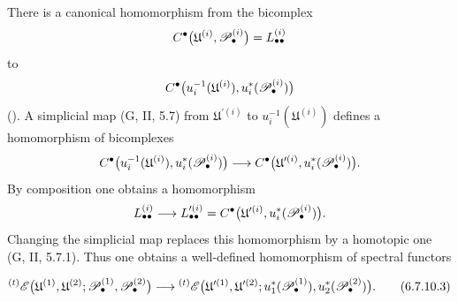 \begin{env}[6.7.10]
There is a canonical homomorphism from the bicomplex
\[
  C^\bullet
  \bigl(
    \mathfrak U^{(i)},\mathscr{P}_\bullet^{(i)}
  \bigr)
  =
  L_{\bullet\bullet}^{(i)}
\]
to
\[
  C^\bullet
  \bigl(
    u_i^{-1}(\mathfrak U^{(i)}),
    u_i^*(\mathscr{P}_\bullet^{(i)})
  \bigr)
\]
().  A simplicial map
\textnormal{(G, II, 5.7)} from $\mathfrak U^{\prime(i)}$ to
$u_i^{-1}(\mathfrak U^{(i)})$ defines a homomorphism of
bicomplexes
\[
  C^\bullet
  \bigl(
    u_i^{-1}(\mathfrak U^{(i)}),
    u_i^*(\mathscr{P}_\bullet^{(i)})
  \bigr)
  \longrightarrow
  C^\bullet
  \bigl(
    \mathfrak U^{\prime(i)},
    u_i^*(\mathscr{P}_\bullet^{(i)})
  \bigr).
\]
By composition one obtains a homomorphism
\[
  L_{\bullet\bullet}^{(i)}
  \longrightarrow
  L_{\bullet\bullet}^{\prime(i)}
  =
  C^\bullet
  \bigl(
    \mathfrak U^{\prime(i)},
    u_i^*(\mathscr{P}_\bullet^{(i)})
  \bigr).
\]
Changing the simplicial map replaces this homomorphism by a
homotopic one \textnormal{(G, II, 5.7.1)}.  Thus one obtains a
well-defined homomorphism of spectral functors
\begin{env}[6.7.10.3]
\label{III.6.7.10.3}
\[
  {}^{(t)}\mathscr{E}
  \bigl(
    \mathfrak U^{(1)},\mathfrak U^{(2)};
    \mathscr{P}_\bullet^{(1)},\mathscr{P}_\bullet^{(2)}
  \bigr)
  \longrightarrow
  {}^{(t)}\mathscr{E}
  \bigl(
    \mathfrak U^{\prime(1)},\mathfrak U^{\prime(2)};
    u_1^*(\mathscr{P}_\bullet^{(1)}),
    u_2^*(\mathscr{P}_\bullet^{(2)})
  \bigr).
  \tag{6.7.10.3}\label{III.6.7.10.3.eq}
\]
\end{env}


\end{env}
